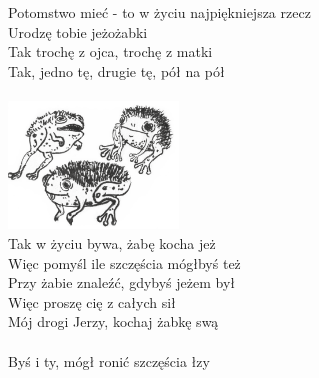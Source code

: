 \documentclass[a5paper, 10pt]{book}
\begin{document}
\begin{minipage}[t]{0.8\textwidth}
\hspace*{5mm}Potomstwo mieć - to w życiu najpiękniejsza rzecz\\
\hspace*{5mm}Urodzę tobie jeżożabki\\
\hspace*{5mm}Tak trochę z ojca, trochę z matki\\
\hspace*{5mm}Tak, jedno tę, drugie tę, pół na pół\\
\\
\includegraphics[height=3.4cm, right]{images/jezozabki.png}\vspace*{-3.4cm}\\
Tak w życiu bywa, żabę kocha jeż\\
Więc pomyśl ile szczęścia mógłbyś też\\
Przy żabie znaleźć, gdybyś jeżem był\\
Więc proszę cię z całych sił\\
Mój drogi Jerzy, kochaj żabkę swą\\
\\
Byś i ty, mógł ronić szczęścia łzy\\
\end{minipage}
\end{document}
